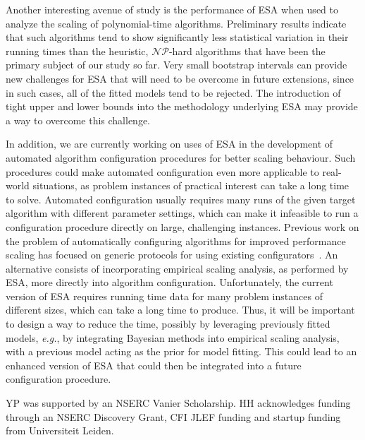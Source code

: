 \documentclass[aic]{iosart2x}
\newcommand{\eg}{\emph{e.g.}}
\begin{document}
Another interesting avenue of study is the performance of ESA when used to analyze the scaling of polynomial-time algorithms. 
Preliminary results indicate that such algorithms tend to show significantly less statistical variation in their running times than the heuristic, $\mathcal{NP}$-hard algorithms that have been the primary subject of our study so far. 
Very small bootstrap intervals can provide new challenges for ESA that will need to be overcome in future extensions, since in such cases, all of the fitted models tend to be rejected. 
The introduction of tight upper and lower bounds into the methodology underlying ESA may provide a way to overcome this challenge.

In addition, we are currently working on uses of ESA in the development of automated algorithm configuration procedures for better scaling behaviour. 
Such procedures could make automated configuration even more applicable to real-world situations, as problem instances of practical interest can take a long time to solve. 
Automated configuration usually requires many runs of the given target algorithm with different parameter settings, which can make it infeasible to run a configuration procedure directly on large, challenging instances.
Previous work on the problem of automatically configuring algorithms for improved performance scaling has focused on generic protocols for using existing configurators~\cite{StyEtAl12,StyHoo13}. 
An alternative consists of incorporating empirical scaling analysis, as performed by ESA, more directly into algorithm configuration. 
Unfortunately, the current version of ESA requires running time data for many problem instances of different sizes,
which can take a long time to produce. 
Thus, it will be important to design a way to reduce the time, possibly by leveraging previously fitted models, \eg{}, by integrating Bayesian methods into empirical scaling analysis, with a previous model acting as the prior for model fitting. 
This could lead to an enhanced version of ESA that could then be integrated into a future configuration procedure.


\begin{acks}
YP was supported by an NSERC Vanier Scholarship. HH acknowledges funding through an NSERC Discovery Grant, CFI JLEF funding and startup funding from Universiteit Leiden.
\end{acks}

\end{document}
